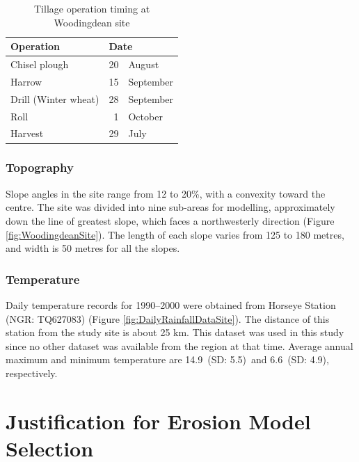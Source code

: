 \begin{table}[htbp]
  \centering
  \caption[Tillage operation timing at Woodingdean site]{Tillage operation
timing at Woodingdean site \citep[From][]{favis-mortlock1998-141}}
  \label{tab:TillageOperationTiming}
    \small
    \begin{tabular}{lr@{ }l}
      \toprule
      \textbf{Operation} & \multicolumn{2}{l}{\textbf{Date}}\\
      \midrule
      Chisel plough & 20 & August\\
      Harrow & 15 & September\\
      Drill (Winter wheat) & 28 & September\\
      Roll & 1 & October\\
      Harvest & 29 & July\\
      \bottomrule
    \end{tabular}
\end{table}

\subsubsection{Topography}
\label{sec:TopographyData}
Slope angles in the site range from 12 to 20\%, with a convexity toward the
centre. The site was divided into nine sub-areas for modelling, approximately
down the line of greatest slope, which faces a northwesterly direction (Figure
\ref{fig:WoodingdeanSite}). The length of each slope varies from 125 to 180
metres, and width is 50 metres for all the slopes.

\subsubsection{Temperature}
\label{sec:Temperature}

Daily temperature records for 1990--2000 were obtained from Horseye Station
(NGR: TQ627083) (Figure \ref{fig:DailyRainfallDataSite}). The distance of this
station from the study site is about 25 km. This dataset was used in this study
since no other dataset was available from the region at that time. Average
annual maximum and minimum temperature are 14.9\textcelsius\ (SD:
5.5\textcelsius)\ and 6.6\textcelsius\ (SD: 4.9\textcelsius), respectively.

\section{Justification for Erosion Model Selection}
\label{sec:ModelConfiguration}

